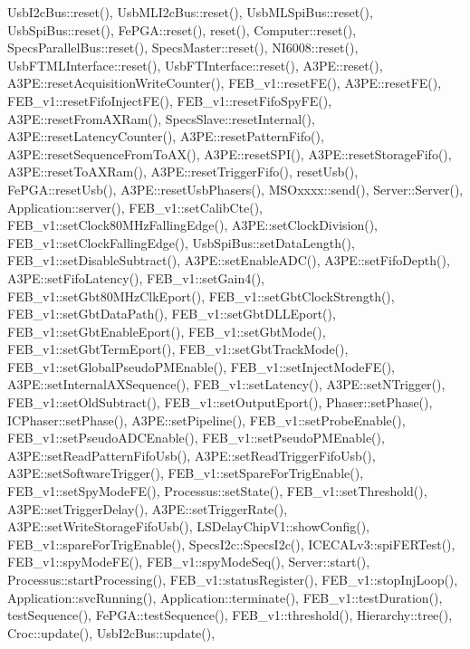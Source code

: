 Usb\+I2c\+Bus\+::reset(), Usb\+M\+L\+I2c\+Bus\+::reset(), Usb\+M\+L\+Spi\+Bus\+::reset(), Usb\+Spi\+Bus\+::reset(), Fe\+P\+G\+A\+::reset(), reset(), Computer\+::reset(), Specs\+Parallel\+Bus\+::reset(), Specs\+Master\+::reset(), N\+I6008\+::reset(), Usb\+F\+T\+M\+L\+Interface\+::reset(), Usb\+F\+T\+Interface\+::reset(), A3\+P\+E\+::reset(), A3\+P\+E\+::reset\+Acquisition\+Write\+Counter(), F\+E\+B\+\_\+v1\+::reset\+F\+E(), A3\+P\+E\+::reset\+F\+E(), F\+E\+B\+\_\+v1\+::reset\+Fifo\+Inject\+F\+E(), F\+E\+B\+\_\+v1\+::reset\+Fifo\+Spy\+F\+E(), A3\+P\+E\+::reset\+From\+A\+X\+Ram(), Specs\+Slave\+::reset\+Internal(), A3\+P\+E\+::reset\+Latency\+Counter(), A3\+P\+E\+::reset\+Pattern\+Fifo(), A3\+P\+E\+::reset\+Sequence\+From\+To\+A\+X(), A3\+P\+E\+::reset\+S\+P\+I(), A3\+P\+E\+::reset\+Storage\+Fifo(), A3\+P\+E\+::reset\+To\+A\+X\+Ram(), A3\+P\+E\+::reset\+Trigger\+Fifo(), reset\+Usb(), Fe\+P\+G\+A\+::reset\+Usb(), A3\+P\+E\+::reset\+Usb\+Phasers(), M\+S\+Oxxxx\+::send(), Server\+::\+Server(), Application\+::server(), F\+E\+B\+\_\+v1\+::set\+Calib\+Cte(), F\+E\+B\+\_\+v1\+::set\+Clock80\+M\+Hz\+Falling\+Edge(), A3\+P\+E\+::set\+Clock\+Division(), F\+E\+B\+\_\+v1\+::set\+Clock\+Falling\+Edge(), Usb\+Spi\+Bus\+::set\+Data\+Length(), F\+E\+B\+\_\+v1\+::set\+Disable\+Subtract(), A3\+P\+E\+::set\+Enable\+A\+D\+C(), A3\+P\+E\+::set\+Fifo\+Depth(), A3\+P\+E\+::set\+Fifo\+Latency(), F\+E\+B\+\_\+v1\+::set\+Gain4(), F\+E\+B\+\_\+v1\+::set\+Gbt80\+M\+Hz\+Clk\+Eport(), F\+E\+B\+\_\+v1\+::set\+Gbt\+Clock\+Strength(), F\+E\+B\+\_\+v1\+::set\+Gbt\+Data\+Path(), F\+E\+B\+\_\+v1\+::set\+Gbt\+D\+L\+L\+Eport(), F\+E\+B\+\_\+v1\+::set\+Gbt\+Enable\+Eport(), F\+E\+B\+\_\+v1\+::set\+Gbt\+Mode(), F\+E\+B\+\_\+v1\+::set\+Gbt\+Term\+Eport(), F\+E\+B\+\_\+v1\+::set\+Gbt\+Track\+Mode(), F\+E\+B\+\_\+v1\+::set\+Global\+Pseudo\+P\+M\+Enable(), F\+E\+B\+\_\+v1\+::set\+Inject\+Mode\+F\+E(), A3\+P\+E\+::set\+Internal\+A\+X\+Sequence(), F\+E\+B\+\_\+v1\+::set\+Latency(), A3\+P\+E\+::set\+N\+Trigger(), F\+E\+B\+\_\+v1\+::set\+Old\+Subtract(), F\+E\+B\+\_\+v1\+::set\+Output\+Eport(), Phaser\+::set\+Phase(), I\+C\+Phaser\+::set\+Phase(), A3\+P\+E\+::set\+Pipeline(), F\+E\+B\+\_\+v1\+::set\+Probe\+Enable(), F\+E\+B\+\_\+v1\+::set\+Pseudo\+A\+D\+C\+Enable(), F\+E\+B\+\_\+v1\+::set\+Pseudo\+P\+M\+Enable(), A3\+P\+E\+::set\+Read\+Pattern\+Fifo\+Usb(), A3\+P\+E\+::set\+Read\+Trigger\+Fifo\+Usb(), A3\+P\+E\+::set\+Software\+Trigger(), F\+E\+B\+\_\+v1\+::set\+Spare\+For\+Trig\+Enable(), F\+E\+B\+\_\+v1\+::set\+Spy\+Mode\+F\+E(), Processus\+::set\+State(), F\+E\+B\+\_\+v1\+::set\+Threshold(), A3\+P\+E\+::set\+Trigger\+Delay(), A3\+P\+E\+::set\+Trigger\+Rate(), A3\+P\+E\+::set\+Write\+Storage\+Fifo\+Usb(), L\+S\+Delay\+Chip\+V1\+::show\+Config(), F\+E\+B\+\_\+v1\+::spare\+For\+Trig\+Enable(), Specs\+I2c\+::\+Specs\+I2c(), I\+C\+E\+C\+A\+Lv3\+::spi\+F\+E\+R\+Test(), F\+E\+B\+\_\+v1\+::spy\+Mode\+F\+E(), F\+E\+B\+\_\+v1\+::spy\+Mode\+Seq(), Server\+::start(), Processus\+::start\+Processing(), F\+E\+B\+\_\+v1\+::status\+Register(), F\+E\+B\+\_\+v1\+::stop\+Inj\+Loop(), Application\+::svc\+Running(), Application\+::terminate(), F\+E\+B\+\_\+v1\+::test\+Duration(), test\+Sequence(), Fe\+P\+G\+A\+::test\+Sequence(), F\+E\+B\+\_\+v1\+::threshold(), Hierarchy\+::tree(), Croc\+::update(), Usb\+I2c\+Bus\+::update(), 
